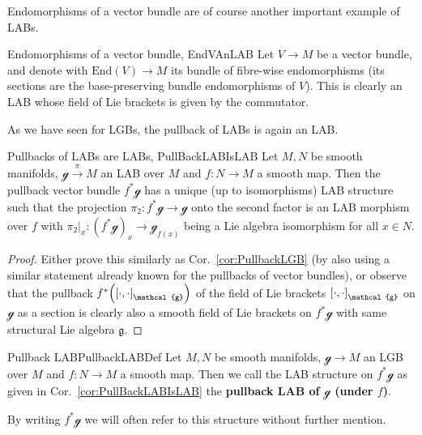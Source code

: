\documentclass[a4paper,oneside,11pt,bibliography=totoc]{scrartcl}
\theoremstyle{plain}
\theoremstyle{remark}
\theoremstyle{definition}
\begin{document}
Endomorphisms of a vector bundle are of course another important example of LABs.

\begin{examples}{Endomorphisms of a vector bundle, \cite[\S 3.3, part of Ex.\ 3.3.4]{mackenzieGeneralTheory}}{EndVAnLAB}
Let $V \to M$ be a vector bundle, and denote with $\mathrm{End}(V) \to M$ its bundle of fibre-wise endomorphisms (its sections are the base-preserving bundle endomorphisms of $V$). This is clearly an LAB whose field of Lie brackets is given by the commutator.
\end{examples}

As we have seen for LGBs, the pullback of LABs is again an LAB.

\begin{corollaries}{Pullbacks of LABs are LABs, \cite[\S 3, Thm.\ 3.2]{PullbackLGBLAB}}{PullBackLABIsLAB}
Let $M, N$ be smooth manifolds, $\mathcal{g} \stackrel{\pi}{\to} M$ an LAB over $M$ and $f: N \to M$ a smooth map. Then the pullback vector bundle $f^*\mathcal{g}$ has a unique (up to isomorphisms) LAB structure such that the projection $\pi_2: f^*\mathcal{g} \to \mathcal{g}$ onto the second factor is an LAB morphism over $f$ with $\pi_2|_x: (f^*\mathcal{g})_x \to \mathcal{g}_{f(x)}$ being a Lie algebra isomorphism for all $x \in N$.
%
\end{corollaries}

\begin{proof}
\leavevmode\newline
Either prove this similarly as Cor.\ \ref{cor:PullbackLGB} (by also using a similar statement already known for the pullbacks of vector bundles), or observe that the pullback $f^*\mleft(\mleft[ \cdot, \cdot \mright]_{\mathcal{g}}\mright)$ of the field of Lie brackets $\mleft[ \cdot, \cdot \mright]_{\mathcal{g}}$ on $\mathcal{g}$ as a section is clearly also a smooth field of Lie brackets on $f^*\mathcal{g}$ with same structural Lie algebra $\mathfrak{g}$.
\end{proof}

\begin{definitions}{Pullback LAB}{PullbackLABDef}
Let $M, N$ be smooth manifolds, $\mathcal{g} \to M$ an LGB over $M$ and $f: N \to M$ a smooth map. Then we call the LAB structure on $f^*\mathcal{g}$ as given in Cor.\ \ref{cor:PullBackLABIsLAB} the \textbf{pullback LAB of $\mathcal{g}$ (under $f$)}.

By writing $f^*\mathcal{g}$ we will often refer to this structure without further mention.
\end{definitions}
\end{document}
